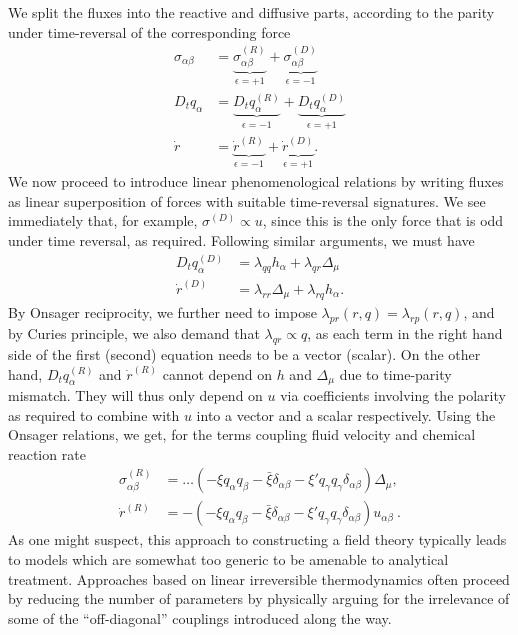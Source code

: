 We split the fluxes into the reactive and diffusive parts, according to the parity under time-reversal of the corresponding force
%
\begin{align}
    \sigma_{\alpha \beta} 
    & = \underbrace{\sigma_{\alpha \beta}^{(R)}}_{\epsilon=+1}
    + \underbrace{\sigma_{\alpha \beta}^{(D)}}_{\epsilon=-1}\\
    D_t q_\alpha
    & = \underbrace{D_t q_\alpha^{(R)}}_{\epsilon=-1}
    + \underbrace{D_t q_\alpha^{(D)}}_{\epsilon=+1}\\
    \dot r
    & = \underbrace{\dot r^{(R)}}_{\epsilon=-1}
    + \underbrace{\dot r^{(D)}}_{\epsilon=+1}.
\end{align}
%
We now proceed to introduce linear phenomenological relations by writing fluxes as linear superposition of forces with suitable time-reversal signatures. We see immediately that, for example, $\sigma^{(D)} \propto u$, since this is the only force that is odd under time reversal, as required.
Following similar arguments, we must have
%
\begin{align}
    D_t q_\alpha^{(D)} &= \lambda_{qq} h_\alpha + \lambda_{qr} \Delta_\mu \\
    \dot r^{(D)} &= \lambda_{rr} \Delta_\mu + \lambda_{rq} h_\alpha.
\end{align}
%
By Onsager reciprocity, we further need to impose $\lambda_{pr}(r, q) = \lambda_{rp}(r, q)$, and by Curies principle, we also demand that $\lambda_{q r} \propto q$, as each term in the right hand side of the first (second) equation needs to be a vector (scalar).
On the other hand, $D_t q_\alpha^{(R)}$ and $\dot r^{(R)}$ cannot depend on $h$ and $\Delta_\mu$ due to time-parity mismatch. They will thus only depend on $u$ via coefficients involving the polarity as required to combine with $u$ into a vector and a scalar respectively.
Using the Onsager relations, we get, for the terms coupling fluid velocity and chemical reaction rate
%
\begin{align}
    \sigma_{\alpha \beta}^{(R)} 
    &= \dots
    \left(- \xi q_\alpha q_\beta - \bar \xi \delta_{\alpha \beta} - \xi' q_\gamma q_\gamma \delta_{\alpha \beta}\right)
    \Delta_\mu, \\
    \dot r^{(R)} 
    &= -
    \left(- \xi q_\alpha q_\beta - \bar \xi \delta_{\alpha \beta} - \xi' q_\gamma q_\gamma \delta_{\alpha \beta}\right)
    u_{\alpha \beta}~.
\end{align}
As one might suspect, this approach to constructing a field theory typically leads to models which are somewhat too generic to be amenable to analytical treatment. Approaches based on linear irreversible thermodynamics often proceed by reducing the number of parameters by physically arguing for the irrelevance of some of the ``off-diagonal'' couplings introduced along the way. 
